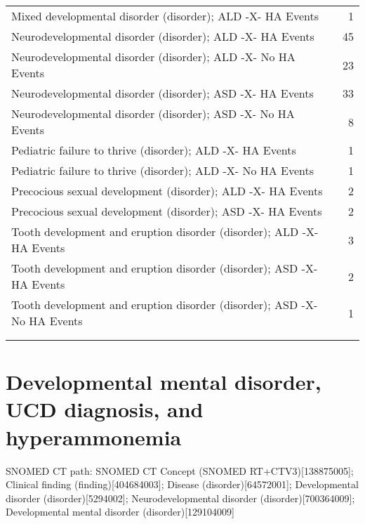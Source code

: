 \documentclass[10pt, letterpaper]{article}
\begin{document}
\begin{spacing}{1.0}
\begin{small}
\begin{longtable}[H]{p{5in}r}
        Mixed developmental disorder (disorder); ALD -X- HA Events & 1 \\
        \rowcolor{ltBlue}
        Neurodevelopmental disorder (disorder); ALD -X- HA Events & 45 \\
        Neurodevelopmental disorder (disorder); ALD -X- No HA Events & 23 \\
        \rowcolor{ltBlue}
        Neurodevelopmental disorder (disorder); ASD -X- HA Events & 33 \\
        Neurodevelopmental disorder (disorder); ASD -X- No HA Events & 8 \\
        \rowcolor{ltBlue}
        Pediatric failure to thrive (disorder); ALD -X- HA Events & 1 \\
        Pediatric failure to thrive (disorder); ALD -X- No HA Events & 1 \\
        \rowcolor{ltBlue}
        Precocious sexual development (disorder); ALD -X- HA Events & 2 \\
        Precocious sexual development (disorder); ASD -X- HA Events & 2 \\
        \rowcolor{ltBlue}
        Tooth development and eruption disorder (disorder); ALD -X- HA Events & 3 \\
        Tooth development and eruption disorder (disorder); ASD -X- HA Events & 2 \\
        \rowcolor{ltBlue}
        Tooth development and eruption disorder (disorder); ASD -X- No HA Events & 1 \\
        & \\[-6pt]
        \hline
        \label{tab:DD-Dx-HA-01}
    \end{longtable}
\end{small}

\clearpage

\section{Developmental mental disorder, UCD diagnosis, and hyperammonemia}

\vspace{10pt}

SNOMED CT path:  \small SNOMED CT Concept (SNOMED RT+CTV3)[138875005]; Clinical finding (finding)[404684003]; Disease (disorder)[64572001]; Developmental disorder (disorder)[5294002]; Neurodevelopmental disorder (disorder)[700364009]; Developmental mental disorder (disorder)[129104009]
\normalsize

\vspace{20pt}


\end{spacing}
\end{document}
